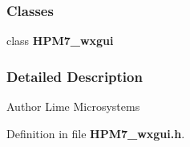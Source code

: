 \subsubsection*{Classes}
\begin{DoxyCompactItemize}
\item 
class {\bf H\+P\+M7\+\_\+wxgui}
\end{DoxyCompactItemize}


\subsubsection{Detailed Description}
\begin{DoxyAuthor}{Author}
Lime Microsystems 
\end{DoxyAuthor}


Definition in file {\bf H\+P\+M7\+\_\+wxgui.\+h}.

